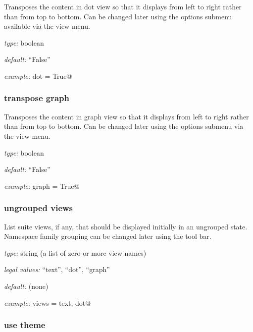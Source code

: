 Transposes the content in dot view so that it displays from left to right rather
than from top to bottom. Can be changed later using the options submenu
available via the view menu.

\begin{myitemize}
    \item {\em type:} boolean
    \item {\em default:} ``False''
    \item {\em example:} \lstinline@transpose dot = True@
\end{myitemize}


\subsubsection{transpose graph}

Transposes the content in graph view so that it displays from left to right
rather than from top to bottom. Can be changed later using the options submenu
via the view menu.

\begin{myitemize}
    \item {\em type:} boolean
    \item {\em default:} ``False''
    \item {\em example:} \lstinline@transpose graph = True@
\end{myitemize}


\subsubsection{ungrouped views}

List suite views, if any, that should be displayed initially in an
ungrouped state. Namespace family grouping can be changed later
using the tool bar.

\begin{myitemize}
\item {\em type:} string (a list of zero or more view names)
\item {\em legal values:} ``text'', ``dot'',  ``graph''
\item {\em default:} (none)
\item {\em example:} \lstinline@ungrouped views = text, dot@
\end{myitemize}


\subsubsection{use theme}

